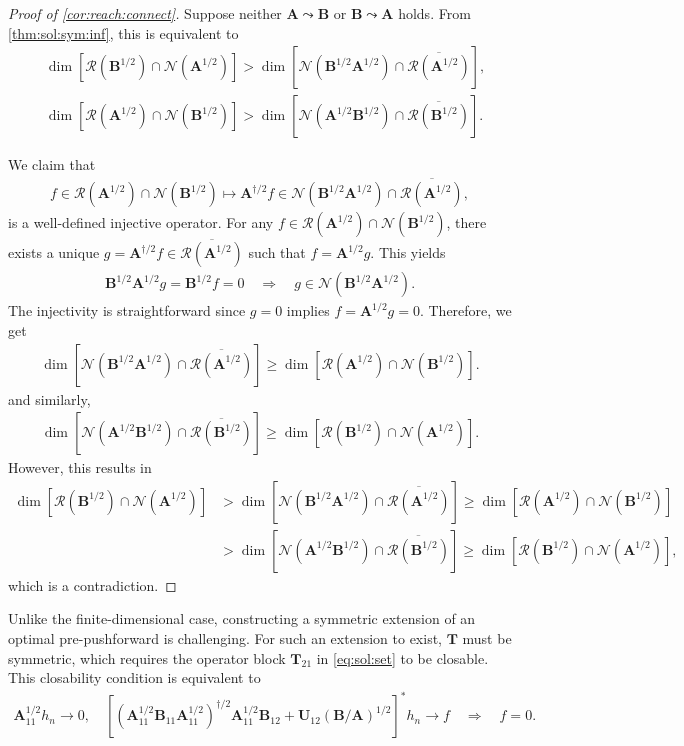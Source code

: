 \documentclass[noinfoline]{imsart}\setcounter{tocdepth}{2}
\newcommand{\m}[1]{\mathbf{#1}} %
\renewcommand{\c}[1]{\mathcal{#1}} %
\theoremstyle{plain}
\begin{document}
\begin{proof}[Proof of \cref{cor:reach:connect}]
Suppose neither $\m{A} \leadsto \m{B}$ or $\m{B} \leadsto \m{A}$ holds. From \cref{thm:sol:sym:inf}, this is equivalent to
\begin{align*}
    &\dim [\c{R}(\m{B}^{1/2}) \cap \c{N}(\m{A}^{1/2})] > \dim [\c{N}(\m{B}^{1/2} \m{A}^{1/2}) \cap \overline{\c{R}(\m{A}^{1/2})}], \\
    &\dim [\c{R}(\m{A}^{1/2}) \cap \c{N}(\m{B}^{1/2})] > \dim [\c{N}(\m{A}^{1/2} \m{B}^{1/2}) \cap \overline{\c{R}(\m{B}^{1/2})}].
\end{align*}

We claim that
\begin{align*}
    f \in \c{R}(\m{A}^{1/2}) \cap \c{N}(\m{B}^{1/2}) \mapsto \m{A}^{\dagger/2} f \in \c{N}(\m{B}^{1/2} \m{A}^{1/2}) \cap \overline{\c{R}(\m{A}^{1/2})},
\end{align*}
is a well-defined injective operator. For any $f \in \c{R}(\m{A}^{1/2}) \cap \c{N}(\m{B}^{1/2})$, there exists a unique $g = \m{A}^{\dagger/2} f \in \overline{\c{R}(\m{A}^{1/2})}$ such that $f = \m{A}^{1/2} g$. This yields
\begin{align*}
    \m{B}^{1/2} \m{A}^{1/2} g = \m{B}^{1/2} f = 0 \quad \Rightarrow \quad g \in \c{N}(\m{B}^{1/2} \m{A}^{1/2}).
\end{align*}
The injectivity is straightforward since $g = 0$ implies $f = \m{A}^{1/2} g = 0$. Therefore, we get
\begin{align*}
    \dim [\c{N}(\m{B}^{1/2} \m{A}^{1/2}) \cap \overline{\c{R}(\m{A}^{1/2})}] \ge \dim [\c{R}(\m{A}^{1/2}) \cap \c{N}(\m{B}^{1/2})].
\end{align*}
and similarly,
\begin{align*}
    \dim [\c{N}(\m{A}^{1/2} \m{B}^{1/2}) \cap \overline{\c{R}(\m{B}^{1/2})}] \ge \dim [\c{R}(\m{B}^{1/2}) \cap \c{N}(\m{A}^{1/2})].
\end{align*}
However, this results in
\begin{align*}
    \dim [\c{R}(\m{B}^{1/2}) \cap \c{N}(\m{A}^{1/2})] &> \dim [\c{N}(\m{B}^{1/2} \m{A}^{1/2}) \cap \overline{\c{R}(\m{A}^{1/2})}] \ge \dim [\c{R}(\m{A}^{1/2}) \cap \c{N}(\m{B}^{1/2})] \\
    &> \dim [\c{N}(\m{A}^{1/2} \m{B}^{1/2}) \cap \overline{\c{R}(\m{B}^{1/2})}] \ge \dim [\c{R}(\m{B}^{1/2}) \cap \c{N}(\m{A}^{1/2})],
\end{align*}
which is a contradiction.
\end{proof}

Unlike the finite-dimensional case, constructing a symmetric extension of an optimal pre-pushforward is challenging. For such an extension to exist, $\m{T}$ must be symmetric, which requires the operator block $\m{T}_{21}$ in \eqref{eq:sol:set} to be closable. This closability condition is equivalent to
\begin{align*}
    \m{A}_{11}^{1/2} h_{n} \to 0, \quad 
    [(\m{A}_{11}^{1/2} \m{B}_{11} \m{A}_{11}^{1/2})^{\dagger/2} \m{A}_{11}^{1/2} \m{B}_{12} + \m{U}_{12} (\m{B}/\m{A})^{1/2}]^{*} h_{n} \to f \quad \Rightarrow \quad f =0.
\end{align*}
\end{document}
